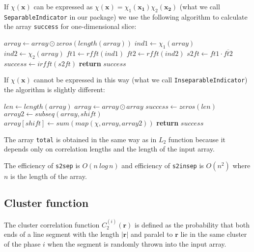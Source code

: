 \documentclass[reprint,amsmath,amssymb,aps,pre]{revtex4-1}
\newcommand{\code}[1]{\colorbox{light-gray}{\texttt{#1}}}
\begin{document}
If $\chi(\bm{x})$ can be expressed as
$\chi(\bm{x}) = \chi_1(\bm{x_1})\chi_2(\bm{x_2})$ (what we call
\code{SeparableIndicator} in our package) we use the following algorithm to
calculate the array \code{success} for one-dimensional slice:
\begin{algorithmic}[1]
    \State $array \gets array \odot zeros(length(array))$ 
  \EndIf
  \State $ind1 \gets \chi_1(array)$ 
  \State $ind2 \gets \chi_2(array)$ 
  \State $ft1 \gets rfft(ind1)$ 
  \State $ft2 \gets rfft(ind2)$
  \State $s2ft \gets ft1 \cdot \overline{ft2}$ 
  \State $success \gets irfft(s2ft)$ 
  \State \textbf{return} $success$
  \EndProcedure
\end{algorithmic}

If $\chi(\bm{x})$ cannot be expressed in this way (what we call
\code{InseparableIndicator}) the algorithm is slightly different:
\begin{algorithmic}[1]
    \State $len \gets length(array)$
      \State $array \gets array \odot array$
    \EndIf
    \State $success \gets zeros(len)$
      \State $array2 \gets subseq(array, shift)$
      \State $array[shift] \gets sum(map(\chi, array, array2))$
    \EndFor
    \State \textbf{return} $success$
  \EndProcedure
\end{algorithmic}

The array \code{total} is obtained in the same way as in $L_2$ function because
it depends only on correlation lengths and the length of the input array.

The efficiency of \code{s2sep} is $O(n\:log\,n)$ and efficiency of
\code{s2insep} is $O(n^2)$ where $n$ is the length of the array.

\subsection{Cluster function}
The cluster correlation function $C_2^{(i)}(\bm{r})$ is defined as the
probability that both ends of a line segment with the length $|\bm{r}|$ and
paralel to $\bm{r}$ lie in the same cluster of the phase $i$ when the segment is
randomly thrown into the input array.
\end{document}
